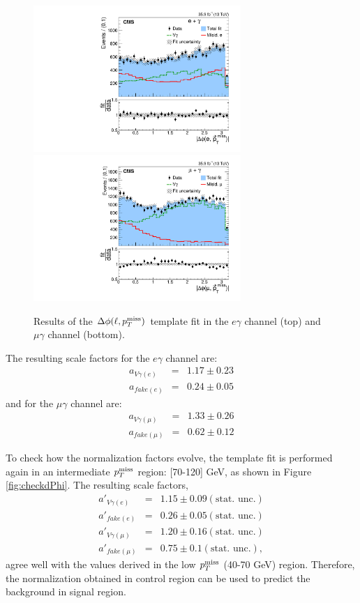 \documentclass[thesis.tex]{subfiles}
\renewcommand\_{\textunderscore\allowbreak}
\begin{document}
\begin{figure}[hbtp]
  \centering
    \includegraphics[width=0.7\textwidth]{Fig/fit_dPhi_eg.pdf} \\
    \includegraphics[width=0.7\textwidth]{Fig/fit_dPhi_mg.pdf}
  \caption{Results of the $\Delta\phi(\ell, p_T^\textrm{miss})$ template fit in the $e\gamma$ channel (top) and $\mu\gamma$ channel (bottom).}
    \label{fig:dphifitresult}
\end{figure}

The resulting scale factors for the $e\gamma$ channel are:
\begin{eqnarray*}
	a_{V\gamma(e)} &=& 1.17 \pm 0.23 \\
	a_{fake(e)}  &=& 0.24 \pm 0.05
\end{eqnarray*}
and for the $\mu\gamma$ channel are:
\begin{eqnarray*}
	a_{V\gamma(\mu)} &=& 1.33 \pm 0.26 \\
	a_{fake(\mu)}  &=& 0.62 \pm 0.12
\end{eqnarray*}

To check how the normalization factors evolve, the template fit is performed again in an intermediate $p_T^\textrm{miss}$ region: [70-120] GeV, as shown in Figure \ref{fig:checkdPhi}. 
The resulting scale factors, 
\begin{eqnarray*}
	a'_{V\gamma(e)} &=& 1.15 \pm 0.09 (\text{stat. unc.}) \\
	a'_{fake(e)}  &=& 0.26 \pm 0.05 (\text{stat. unc.}) \\
	a'_{V\gamma(\mu)} &=& 1.20 \pm 0.16 (\text{stat. unc.}) \\
	a'_{fake(\mu)}  &=& 0.75 \pm 0.1 (\text{stat. unc.}),
\end{eqnarray*}
agree well with the values derived in the low $p_T^\textrm{miss}$ (40-70 GeV) region. 
Therefore, the normalization obtained in control region can be used to predict the background in signal region.
\end{document}
